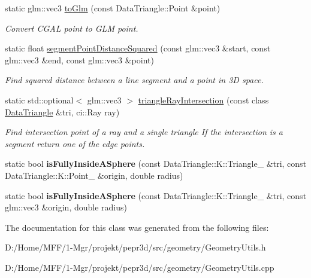\begin{DoxyCompactItemize}
\item 
\mbox{\label{classpepr3d_1_1_geometry_utils_a7839bba988d139bc20f9bcb72386cda7}} 
static glm\+::vec3 \mbox{\hyperlink{classpepr3d_1_1_geometry_utils_a7839bba988d139bc20f9bcb72386cda7}{to\+Glm}} (const Data\+Triangle\+::\+Point \&point)
\begin{DoxyCompactList}\small\item\em Convert C\+G\+AL point to G\+LM point. \end{DoxyCompactList}\item 
\mbox{\label{classpepr3d_1_1_geometry_utils_a3c0957732e9c372ca63b5271cf91d98d}} 
static float \mbox{\hyperlink{classpepr3d_1_1_geometry_utils_a3c0957732e9c372ca63b5271cf91d98d}{segment\+Point\+Distance\+Squared}} (const glm\+::vec3 \&start, const glm\+::vec3 \&end, const glm\+::vec3 \&point)
\begin{DoxyCompactList}\small\item\em Find squared distance between a line segment and a point in 3D space. \end{DoxyCompactList}\item 
\mbox{\label{classpepr3d_1_1_geometry_utils_afee093fc93f94d5d7552611a34931ea2}} 
static std\+::optional$<$ glm\+::vec3 $>$ \mbox{\hyperlink{classpepr3d_1_1_geometry_utils_afee093fc93f94d5d7552611a34931ea2}{triangle\+Ray\+Intersection}} (const class \mbox{\hyperlink{classpepr3d_1_1_data_triangle}{Data\+Triangle}} \&tri, ci\+::\+Ray ray)
\begin{DoxyCompactList}\small\item\em Find intersection point of a ray and a single triangle If the intersection is a segment return one of the edge points. \end{DoxyCompactList}\item 
\mbox{\label{classpepr3d_1_1_geometry_utils_a1c82cbd47ad61dbf93685a3daf47c49a}} 
static bool {\bfseries is\+Fully\+Inside\+A\+Sphere} (const Data\+Triangle\+::\+K\+::\+Triangle\+\_ \&tri, const Data\+Triangle\+::\+K\+::\+Point\+\_ \&origin, double radius)
\item 
\mbox{\label{classpepr3d_1_1_geometry_utils_a7ee493c277ad6aa4e87b2508a0f6c2c9}} 
static bool {\bfseries is\+Fully\+Inside\+A\+Sphere} (const Data\+Triangle\+::\+K\+::\+Triangle\+\_ \&tri, const glm\+::vec3 \&origin, double radius)
\end{DoxyCompactItemize}


The documentation for this class was generated from the following files\+:\begin{DoxyCompactItemize}
\item 
D\+:/\+Home/\+M\+F\+F/1-\/\+Mgr/projekt/pepr3d/src/geometry/Geometry\+Utils.\+h\item 
D\+:/\+Home/\+M\+F\+F/1-\/\+Mgr/projekt/pepr3d/src/geometry/Geometry\+Utils.\+cpp\end{DoxyCompactItemize}
